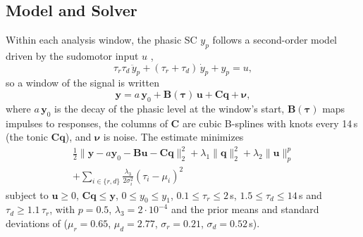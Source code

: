 \documentclass[conference]{IEEEtran}
\begin{document}
\subsection{Model and Solver}\label{sec:model}
Within each analysis window, the phasic SC $y_p$ follows a second-order model driven by the
sudomotor input $u$ \cite{amin2021},
\begin{equation}
\tau_r\tau_d\,\ddot y_p + (\tau_r+\tau_d)\,\dot y_p + y_p = u ,
\end{equation}
so a window of the signal is written
\begin{equation}
\mathbf{y} = a\,\mathbf{y}_0 + \mathbf{B}(\boldsymbol{\tau})\,\mathbf{u} + \mathbf{C}\mathbf{q}
+ \boldsymbol{\nu},
\end{equation}
where $a\,\mathbf{y}_0$ is the decay of the phasic level at the window's start,
$\mathbf{B}(\boldsymbol{\tau})$ maps impulses to responses, the columns of $\mathbf{C}$ are cubic
B-splines with knots every 14\,s (the tonic $\mathbf{C}\mathbf{q}$), and $\boldsymbol{\nu}$ is
noise. The estimate minimizes
\begin{multline}
\tfrac12\bigl\|\mathbf{y}-a\mathbf{y}_0-\mathbf{B}\mathbf{u}-\mathbf{C}\mathbf{q}\bigr\|_2^2
+\lambda_1\|\mathbf{q}\|_2^2+\lambda_2\|\mathbf{u}\|_p^p \\
+\sum_{i\in\{r,d\}}\frac{\lambda_3}{2\sigma_i^2}(\tau_i-\mu_i)^2
\end{multline}
subject to $\mathbf{u}\ge 0$, $\mathbf{C}\mathbf{q}\le\mathbf{y}$, $0\le y_0\le y_1$,
$0.1\le\tau_r\le 2$\,s, $1.5\le\tau_d\le 14$\,s and $\tau_d\ge 1.1\,\tau_r$, with $p=0.5$,
$\lambda_3=2\cdot10^{-4}$ and the prior means and standard deviations of \cite{amin2021}
($\mu_r=0.65$, $\mu_d=2.77$, $\sigma_r=0.21$, $\sigma_d=0.52$\,s).
\end{document}
